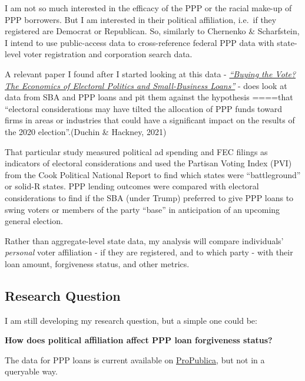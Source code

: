 \documentclass[
  letterpaper,
  DIV=11,
  numbers=noendperiod]{scrartcl}
\begin{document}
I am not so much interested in the efficacy of the PPP or the racial
make-up of PPP borrowers. But I am interested in their political
affiliation, i.e.~if they registered are Democrat or Republican. So,
similarly to Chernenko \& Scharfstein, I intend to use public-access
data to cross-reference federal PPP data with state-level voter
registration and corporation search data.

A relevant paper I found after I started looking at this data -
\href{https://www.cambridge.org/core/journals/journal-of-financial-and-quantitative-analysis/article/abs/buying-the-vote-the-economics-of-electoral-politics-and-smallbusiness-loans/A57A977A59DB24A010DD1D33DFDE7BE3}{\emph{``Buying
the Vote? The Economics of Electoral Politics and Small-Business
Loans''}} - does look at data from SBA and PPP loans and pit them
against the hypothesis ====that ``electoral considerations may have
tilted the allocation of PPP funds toward firms in areas or industries
that could have a significant impact on the results of the 2020
election''.(Duchin \& Hackney, 2021)

That particular study measured political ad spending and FEC filings as
indicators of electoral considerations and used the Partisan Voting
Index (PVI) from the Cook Political National Report to find which states
were ``battleground'' or solid-R states. PPP lending outcomes were
compared with electoral considerations to find if the SBA (under Trump)
preferred to give PPP loans to swing voters or members of the party
``base'' in anticipation of an upcoming general election.

Rather than aggregate-level state data, my analysis will compare
individuals' \emph{personal} voter affiliation - if they are registered,
and to which party - with their loan amount, forgiveness status, and
other metrics.

\hypertarget{research-question}{%
\subsection{Research Question}\label{research-question}}

I am still developing my research question, but a simple one could be:

\textbf{How does political affiliation affect PPP loan forgiveness
status?}

The data for PPP loans is current available on
\href{https://projects.propublica.org/coronavirus/bailouts/}{ProPublica},
but not in a queryable way.
\end{document}

